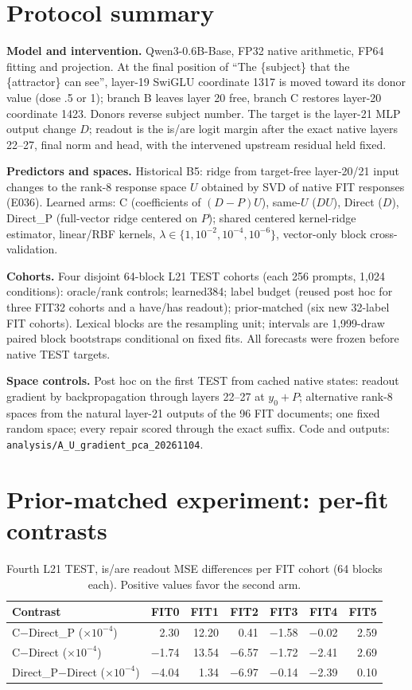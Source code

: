\documentclass[11pt]{article}
\begin{document}
\clearpage
\small


\appendix
\section{Protocol summary}\label{app:protocol}
\textbf{Model and intervention.} Qwen3-0.6B-Base, FP32 native arithmetic, FP64 fitting and projection. At the final position of ``The \{subject\} that the \{attractor\} can see'', layer-19 SwiGLU coordinate 1317 is moved toward its donor value (dose .5 or 1); branch B leaves layer 20 free, branch C restores layer-20 coordinate 1423. Donors reverse subject number. The target is the layer-21 MLP output change $D$; readout is the is/are logit margin after the exact native layers 22--27, final norm and head, with the intervened upstream residual held fixed.

\textbf{Predictors and spaces.} Historical B5: ridge from target-free layer-20/21 input changes to the rank-8 response space $U$ obtained by SVD of native FIT responses (E036). Learned arms: C (coefficients of $(D-P)U$), same-$U$ ($DU$), Direct ($D$), Direct\_P (full-vector ridge centered on $P$); shared centered kernel-ridge estimator, linear/RBF kernels, $\lambda\in\{1,10^{-2},10^{-4},10^{-6}\}$, vector-only block cross-validation.

\textbf{Cohorts.} Four disjoint 64-block L21 TEST cohorts (each 256 prompts, 1,024 conditions): oracle/rank controls; learned384; label budget (reused post hoc for three FIT32 cohorts and a have/has readout); prior-matched (six new 32-label FIT cohorts). Lexical blocks are the resampling unit; intervals are 1,999-draw paired block bootstraps conditional on fixed fits. All forecasts were frozen before native TEST targets.

\textbf{Space controls.} Post hoc on the first TEST from cached native states: readout gradient by backpropagation through layers 22--27 at $y_0+P$; alternative rank-8 spaces from the natural layer-21 outputs of the 96 FIT documents; one fixed random space; every repair scored through the exact suffix. Code and outputs: \texttt{analysis/A\_U\_gradient\_pca\_20261104}.

\section{Prior-matched experiment: per-fit contrasts}\label{app:prior}
\begin{table}[ht]\centering\small
\begin{tabular}{lrrrrrr}\toprule Contrast & FIT0 & FIT1 & FIT2 & FIT3 & FIT4 & FIT5\\\midrule
C$-$Direct\_P ($\times10^{-4}$) & 2.30 & 12.20 & 0.41 & $-$1.58 & $-$0.02 & 2.59\\
C$-$Direct ($\times10^{-4}$) & $-$1.74 & 13.54 & $-$6.57 & $-$1.72 & $-$2.41 & 2.69\\
Direct\_P$-$Direct ($\times10^{-4}$) & $-$4.04 & 1.34 & $-$6.97 & $-$0.14 & $-$2.39 & 0.10\\\bottomrule\end{tabular}
\caption{Fourth L21 TEST, is/are readout MSE differences per FIT cohort (64 blocks each). Positive values favor the second arm.}\label{tab:priorfits}
\end{table}
\end{document}

